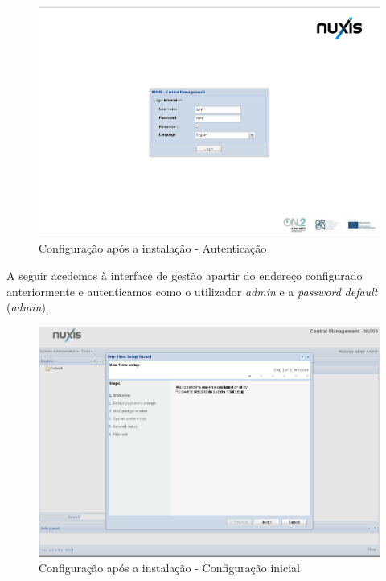 \begin{figure}[H]
	\begin{center}
    \includegraphics[scale=0.4]{screenshots/install/nuxis/nuxis_enterprise_pos_install_21.png}
    \caption{Configuração após a instalação - Autenticação}
	\label{fig:installation_enterprise_pos_03}
	\end{center}
\end{figure}

A seguir acedemos à interface de gestão apartir do endereço configurado anteriormente e autenticamos como o utilizador \emph{admin} e a \emph{password} \emph{default} (\emph{admin}).

\begin{figure}[H]
	\begin{center}
    \includegraphics[scale=0.4]{screenshots/install/nuxis/nuxis_enterprise_wiz_install_22.png}
    \caption{Configuração após a instalação - Configuração inicial}
	\label{fig:installation_enterprise_wiz_01}
	\end{center}
\end{figure}


